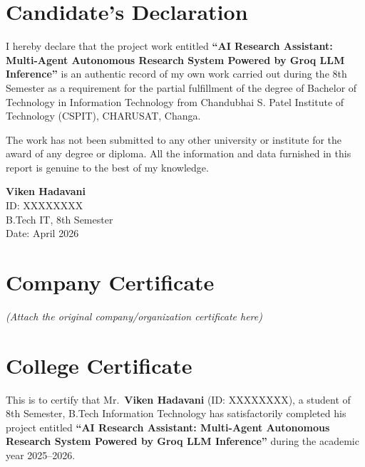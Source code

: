 \documentclass[a4paper,12pt]{report}
\begin{document}
\pagestyle{frontmatter}

\chapter*{Candidate's Declaration}

I hereby declare that the project work entitled \textbf{``AI Research Assistant: Multi-Agent Autonomous Research System Powered by Groq LLM Inference''} is an authentic record of my own work carried out during the 8th Semester as a requirement for the partial fulfillment of the degree of Bachelor of Technology in Information Technology from Chandubhai S. Patel Institute of Technology (CSPIT), CHARUSAT, Changa.

The work has not been submitted to any other university or institute for the award of any degree or diploma. All the information and data furnished in this report is genuine to the best of my knowledge.

\vspace{2cm}
\begin{flushright}
\textbf{Viken Hadavani}\\
ID: XXXXXXXX\\
B.Tech IT, 8th Semester\\
Date: April 2026
\end{flushright}

\newpage

\chapter*{Company Certificate}
\begin{center}
\textit{(Attach the original company/organization certificate here)}
\end{center}
\newpage

\chapter*{College Certificate}

This is to certify that Mr.\ \textbf{Viken Hadavani} (ID: XXXXXXXX), a student of 8th Semester, B.Tech Information Technology has satisfactorily completed his project entitled \textbf{``AI Research Assistant: Multi-Agent Autonomous Research System Powered by Groq LLM Inference''} during the academic year 2025--2026.
\end{document}
